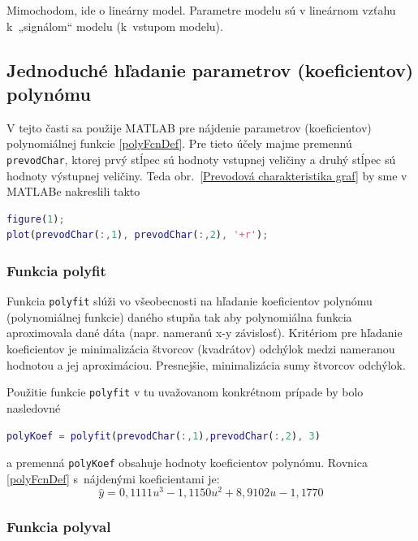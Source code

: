 \documentclass[a4paper, 10pt, ]{article}
\begin{document}
Mimochodom, ide o lineárny model. Parametre modelu sú v lineárnom vzťahu k~„signálom“ modelu (k~vstupom modelu).






\subsection{Jednoduché hľadanie parametrov (koeficientov) polynómu}

V tejto časti sa použije MATLAB pre nájdenie parametrov (koeficientov) polynomiálnej funkcie \eqref{polyFcnDef}. Pre tieto účely majme premennú \verb|prevodChar|, ktorej prvý stĺpec sú hodnoty vstupnej veličiny a druhý stĺpec sú hodnoty výstupnej veličiny. Teda obr.~\ref{Prevodová charakteristika graf} by sme v MATLABe nakreslili takto
\begin{lstlisting}[language=Matlab,]
figure(1);
plot(prevodChar(:,1), prevodChar(:,2), '+r');
\end{lstlisting}






\subsubsection{Funkcia polyfit}

Funkcia \verb|polyfit| slúži vo všeobecnosti na hľadanie koeficientov polynómu (polynomiálnej funkcie) daného stupňa tak aby polynomiálna funkcia aproximovala dané dáta (napr. nameranú x-y závislosť). Kritériom pre hľadanie koeficientov je minimalizácia štvorcov (kvadrátov) odchýlok medzi nameranou hodnotou a jej aproximáciou. Presnejšie, minimalizácia sumy štvorcov odchýlok.

Použitie funkcie \verb|polyfit| v tu uvažovanom konkrétnom prípade by bolo nasledovné
\begin{lstlisting}[language=Matlab,]
polyKoef = polyfit(prevodChar(:,1),prevodChar(:,2), 3)
\end{lstlisting}
a premenná \verb|polyKoef| obsahuje hodnoty koeficientov polynómu. Rovnica \eqref{polyFcnDef} s~nájdenými koeficientami je:
\begin{equation} \label{modelPolifitVysl}
    \hat y = 0,1111 u^3  -1,1150 u^2 + 8,9102 u  -1,1770
\end{equation}






\subsubsection{Funkcia polyval}
\end{document}
